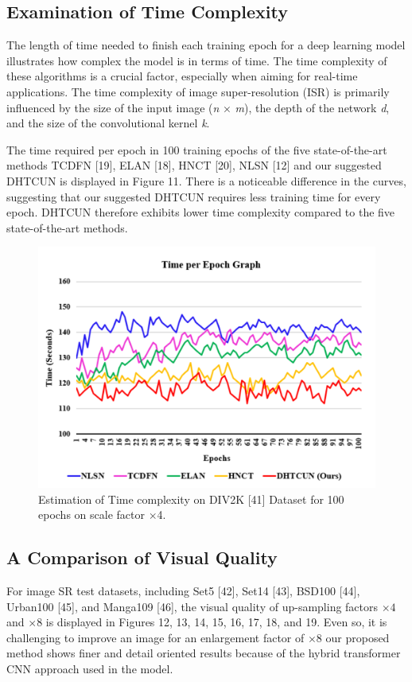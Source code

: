 \documentclass{ieeeaccess}
\begin{document}
\subsection{Examination of Time Complexity}

The length of time needed to finish each training epoch for a deep learning model illustrates how complex the model is in terms of time. The time complexity of these algorithms is a crucial factor, especially when aiming for real-time applications. The time complexity of image super-resolution (ISR) is primarily influenced by the size of the input image (\textit{n} × \textit{m}), the depth of the network \textit{d}, and the size of the convolutional kernel \textit{k}. 

The time required per epoch in 100 training epochs of the five state-of-the-art methods TCDFN [19], ELAN [18], HNCT [20], NLSN [12] and our suggested DHTCUN is displayed in Figure 11. There is a noticeable difference in the curves, suggesting that our suggested DHTCUN requires less training time for every epoch. DHTCUN therefore exhibits lower time complexity compared to the five state-of-the-art methods.

\begin{figure}[ht]
  \includegraphics[width=\linewidth]{11FIGURE.pdf}
  \caption{Estimation of Time complexity on DIV2K [41] Dataset for 100 epochs on scale factor $\times$4.}
  \label{fig:11}
\end{figure}

\subsection{A Comparison of Visual Quality}
For image SR test datasets, including Set5 [42], Set14 [43], BSD100 [44], Urban100 [45], and Manga109 [46], the visual quality of up-sampling factors $\times 4$ and $\times 8$ is displayed in Figures 12, 13, 14, 15, 16, 17, 18, and 19. Even so, it is challenging to improve an image for an enlargement factor of $\times 8$ our proposed method shows finer and detail oriented results because of the hybrid transformer CNN approach used in the model.
\newline
\end{document}
